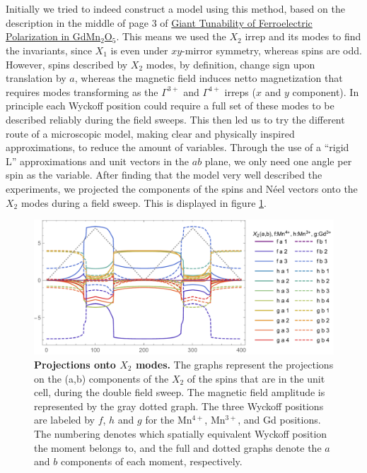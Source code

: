 \documentclass[a4, UTF8]{article}
\begin{document}
\\\\
Initially we tried to indeed construct a model using this method, based on the description in the middle of page 3 of \href{https://link.aps.org/doi/10.1103/PhysRevLett.110.137203}{Giant Tunability of Ferroelectric Polarization in GdMn$_2$O$_5$}. This means we used the $X_2$ irrep and its modes to find the invariants, since $X_1$ is even under $xy$-mirror symmetry, whereas spins are odd.
However, spins described by $X_2$ modes, by definition, change sign upon translation by $a$, whereas the magnetic field induces netto magnetization that requires modes transforming as the $\Gamma^{3+}$ and $\Gamma^{4+}$ irreps ($x$ and $y$ component).
In principle each Wyckoff position could require a full set of these modes to be described reliably during the field sweeps.
This then led us to try the different route of a microscopic model, making clear and physically inspired approximations, to reduce the amount of variables. 
Through the use of a ``rigid L'' approximations and unit vectors in the $ab$ plane, we only need one angle per spin as the variable.
After finding that the model very well described the experiments, we projected the components of the spins and N\'eel vectors onto the $X_2$ modes during a field sweep. This is displayed in figure \ref{allirreps}.
\begin{figure}[h]
	\includegraphics[width=\textwidth]{allIrreps.pdf}
	\caption{\label{allirreps}{\bf Projections onto $X_2$ modes.} The graphs represent the projections on the (a,b) components of the $X_2$ of the spins that are in the unit cell, during the double field sweep. The magnetic field amplitude is represented by the gray dotted graph. The three Wyckoff positions are labeled by $f$, $h$ and $g$ for the Mn$^{4+}$, Mn$^{3+}$, and Gd positions. The numbering denotes which spatially equivalent Wyckoff position the moment belongs to, and the full and dotted graphs denote the $a$ and $b$ components of each moment, respectively.}
\end{figure}
\end{document}

